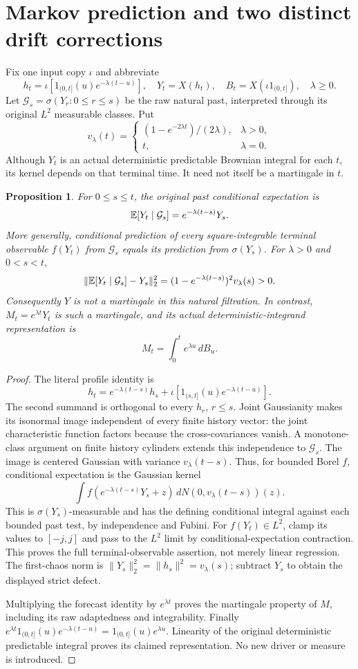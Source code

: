 \documentclass[11pt]{article}
\newtheorem{proposition}[theorem]{Proposition}
\begin{document}
\section{Markov prediction and two distinct drift corrections}
Fix one input copy $\iota$ and abbreviate
\[
 h_t=\iota[1_{(0,t]}(u)e^{-\lambda(t-u)}],\quad
 Y_t=X(h_t),\quad B_t=X(\iota1_{(0,t]}),\quad \lambda\geq0.
\]
Let $\mathcal G_s=\sigma(Y_r:0\leq r\leq s)$ be the raw natural
past, interpreted through its original $L^2$ measurable classes. Put
\[
 v_\lambda(t)=\begin{cases}(1-e^{-2\lambda t})/(2\lambda),&\lambda>0,\\
 t,&\lambda=0.\end{cases}
\]
Although $Y_t$ is an actual deterministic predictable Brownian
integral for each $t$, its kernel depends on that terminal time.
It need not itself be a martingale in $t$.

\begin{proposition}\label{prop:ou-prediction}
For $0\leq s\leq t$, the original past conditional expectation is
\[
 \mathbb E[Y_t\mid\mathcal G_s]=e^{-\lambda(t-s)}Y_s.
\]
More generally, conditional prediction of every square-integrable
terminal observable $f(Y_t)$ from $\mathcal G_s$ equals its prediction
from $\sigma(Y_s)$. For $\lambda>0$ and $0<s<t$,
\[
 \|\mathbb E[Y_t\mid\mathcal G_s]-Y_s\|_2^2
 =(1-e^{-\lambda(t-s)})^2v_\lambda(s)>0.
\]
Consequently $Y$ is not a martingale in this natural filtration.
In contrast, $M_t=e^{\lambda t}Y_t$ is such a martingale, and its
actual deterministic-integrand representation is
\[
 M_t=\int_0^t e^{\lambda u}\,dB_u.
\]
\end{proposition}
\begin{proof}
The literal profile identity is
\[
 h_t=e^{-\lambda(t-s)}h_s+
 \iota[1_{(s,t]}(u)e^{-\lambda(t-u)}].
\]
The second summand is orthogonal to every $h_r$, $r\leq s$.
Joint Gaussianity makes its isonormal image independent of every
finite history vector: the joint characteristic function factors
because the cross-covariances vanish. A monotone-class argument on
finite history cylinders extends this independence to
$\mathcal G_s$. The image is centered Gaussian with variance
$v_\lambda(t-s)$. Thus, for bounded Borel $f$, conditional expectation
is the Gaussian kernel
\[
 \int f(e^{-\lambda(t-s)}Y_s+z)\,
       dN(0,v_\lambda(t-s))(z).
\]
This is $\sigma(Y_s)$-measurable and has the defining conditional
integral against each bounded past test, by independence and Fubini.
For $f(Y_t)\in L^2$, clamp its values to $[-j,j]$ and pass to the
$L^2$ limit by conditional-expectation contraction. This proves the
full terminal-observable assertion, not merely linear regression.
The first-chaos norm is $\|Y_s\|_2^2=\|h_s\|^2=v_\lambda(s)$;
subtract $Y_s$ to obtain the displayed strict defect.

Multiplying the forecast identity by $e^{\lambda t}$ proves the
martingale property of $M$, including its raw adaptedness and
integrability. Finally
$e^{\lambda t}1_{(0,t]}(u)e^{-\lambda(t-u)}
 =1_{(0,t]}(u)e^{\lambda u}$.
Linearity of the original deterministic predictable integral proves
its claimed representation. No new driver or measure is introduced.
\end{proof}
\end{document}
